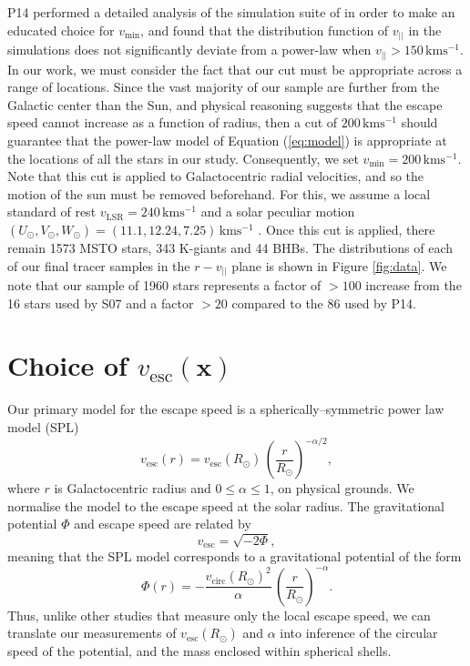 \documentclass[useAMS,twocolumn,usenatbib]{mn2e}
\def\kms{{\,\mathrm{kms^{-1}}}}
\def\vlos{{v_{||}}}
\def\vesc{{v_\mathrm{esc}}}
\def\pos{{\boldsymbol{x}}}
\begin{document}
P14 performed a detailed analysis of the simulation suite of \citet{Sc09} in order to make an educated choice for $v_\mathrm{min}$, and found that the distribution function of $\vlos$ in the simulations does not significantly deviate from a power-law when $\vlos>150\kms$. 
In our work, we must consider the fact that our cut must be appropriate across a range of locations. 
Since the vast majority of our sample are further from the Galactic center than the Sun, and physical reasoning suggests that the escape speed cannot increase as a function of radius, then a cut of $200\kms$ should guarantee that the power-law model of Equation (\ref{eq:model}) is appropriate at the locations of all the stars in our study. 
Consequently, we set $v_\mathrm{min}=200\kms$.  
Note that this cut is applied to Galactocentric radial velocities, and so the motion of the sun must be removed beforehand. 
For this, we assume a local standard of rest $v_\mathrm{LSR} = 240\kms$ and a solar peculiar motion $\left(U_\odot,V_\odot,W_\odot\right) = \left(11.1,12.24,7.25\right)\kms$ \citep{Sc10}.
Once this cut is applied, there remain 1573 MSTO stars, 343 K-giants and 44 BHBs. 
The distributions of each of our final tracer samples in the $r-\vlos$ plane is shown in Figure \ref{fig:data}. 
We note that our sample of 1960 stars represents a factor of $>100$ increase from the 16 stars used by S07 and a factor $>20$ compared to the 86 used by P14.

\section{Choice of $\vesc(\pos)$}

\label{sec:pot}

Our primary model for the escape speed is a spherically--symmetric power law model (SPL)
%
\begin{equation}
\vesc(r) = \vesc(R_\odot)\,\left(\dfrac{r}{R_\odot}\right)^{-\alpha/2},
\end{equation}
%
where $r$ is Galactocentric radius and $0 \leq \alpha \leq 1$, on physical grounds.  
We normalise the model to the escape speed at the solar radius. 
The gravitational potential $\Phi$ and escape speed are related by
%
\begin{equation}
\vesc = \sqrt{-2\Phi},
\end{equation}
%
meaning that the SPL model corresponds to a gravitational potential of the form
%
\begin{equation}
\Phi(r) = -\dfrac{v_\mathrm{circ}(R_\odot)^2}{\alpha}\,\left(\dfrac{r}{R_\odot}\right)^{-\alpha}.
\label{eq:splgrav}
\end{equation}
%
Thus, unlike other studies that measure only the local escape speed, we can translate our measurements of $\vesc(R_\odot)$ and $\alpha$ into inference of the circular speed of the potential, and the mass enclosed within spherical shells. 
\end{document}
